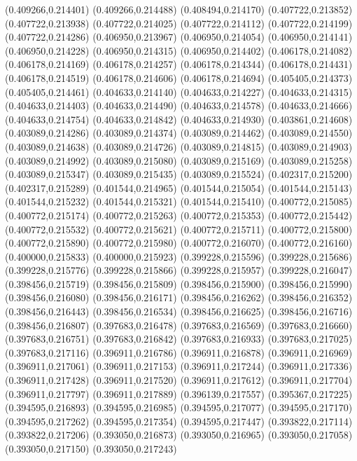 (0.409266,0.214401)
(0.409266,0.214488)
(0.408494,0.214170)
(0.407722,0.213852)
(0.407722,0.213938)
(0.407722,0.214025)
(0.407722,0.214112)
(0.407722,0.214199)
(0.407722,0.214286)
(0.406950,0.213967)
(0.406950,0.214054)
(0.406950,0.214141)
(0.406950,0.214228)
(0.406950,0.214315)
(0.406950,0.214402)
(0.406178,0.214082)
(0.406178,0.214169)
(0.406178,0.214257)
(0.406178,0.214344)
(0.406178,0.214431)
(0.406178,0.214519)
(0.406178,0.214606)
(0.406178,0.214694)
(0.405405,0.214373)
(0.405405,0.214461)
(0.404633,0.214140)
(0.404633,0.214227)
(0.404633,0.214315)
(0.404633,0.214403)
(0.404633,0.214490)
(0.404633,0.214578)
(0.404633,0.214666)
(0.404633,0.214754)
(0.404633,0.214842)
(0.404633,0.214930)
(0.403861,0.214608)
(0.403089,0.214286)
(0.403089,0.214374)
(0.403089,0.214462)
(0.403089,0.214550)
(0.403089,0.214638)
(0.403089,0.214726)
(0.403089,0.214815)
(0.403089,0.214903)
(0.403089,0.214992)
(0.403089,0.215080)
(0.403089,0.215169)
(0.403089,0.215258)
(0.403089,0.215347)
(0.403089,0.215435)
(0.403089,0.215524)
(0.402317,0.215200)
(0.402317,0.215289)
(0.401544,0.214965)
(0.401544,0.215054)
(0.401544,0.215143)
(0.401544,0.215232)
(0.401544,0.215321)
(0.401544,0.215410)
(0.400772,0.215085)
(0.400772,0.215174)
(0.400772,0.215263)
(0.400772,0.215353)
(0.400772,0.215442)
(0.400772,0.215532)
(0.400772,0.215621)
(0.400772,0.215711)
(0.400772,0.215800)
(0.400772,0.215890)
(0.400772,0.215980)
(0.400772,0.216070)
(0.400772,0.216160)
(0.400000,0.215833)
(0.400000,0.215923)
(0.399228,0.215596)
(0.399228,0.215686)
(0.399228,0.215776)
(0.399228,0.215866)
(0.399228,0.215957)
(0.399228,0.216047)
(0.398456,0.215719)
(0.398456,0.215809)
(0.398456,0.215900)
(0.398456,0.215990)
(0.398456,0.216080)
(0.398456,0.216171)
(0.398456,0.216262)
(0.398456,0.216352)
(0.398456,0.216443)
(0.398456,0.216534)
(0.398456,0.216625)
(0.398456,0.216716)
(0.398456,0.216807)
(0.397683,0.216478)
(0.397683,0.216569)
(0.397683,0.216660)
(0.397683,0.216751)
(0.397683,0.216842)
(0.397683,0.216933)
(0.397683,0.217025)
(0.397683,0.217116)
(0.396911,0.216786)
(0.396911,0.216878)
(0.396911,0.216969)
(0.396911,0.217061)
(0.396911,0.217153)
(0.396911,0.217244)
(0.396911,0.217336)
(0.396911,0.217428)
(0.396911,0.217520)
(0.396911,0.217612)
(0.396911,0.217704)
(0.396911,0.217797)
(0.396911,0.217889)
(0.396139,0.217557)
(0.395367,0.217225)
(0.394595,0.216893)
(0.394595,0.216985)
(0.394595,0.217077)
(0.394595,0.217170)
(0.394595,0.217262)
(0.394595,0.217354)
(0.394595,0.217447)
(0.393822,0.217114)
(0.393822,0.217206)
(0.393050,0.216873)
(0.393050,0.216965)
(0.393050,0.217058)
(0.393050,0.217150)
(0.393050,0.217243)
